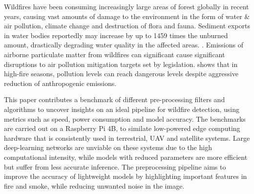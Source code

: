 \documentclass[lettersize,journal]{IEEEtran}
\begin{document}
Wildfires have been consuming increasingly large areas of forest globally in recent years, causing vast amounts of damage to the environment in the form of water & air pollution, climate change and destruction of flora and fauna.
Sediment exports in water bodies reportedly may increase by up to 1459 times the unburned amount, drastically degrading water quality in the affected areas. \cite{wildfirewater}.
Emissions of airborne particulate matter from wildfires can significant cause significant disruptions to air pollution mitigation targets set by legislation. \cite{wildfireair} shows that in high-fire seasons, pollution levels can reach dangerous levels despite aggressive reduction of anthropogenic emissions.









This paper contributes a benchmark of different pre-processing filters
and algorithms to uncover insights on an ideal pipeline for wildfire
detection, using metrics such as speed, power consumption and model
accuracy. The benchmarks are carried out on a Raspberry Pi 4B, to
similate low-powered edge computing hardware that is consistently used
in terrestrial, UAV and satellite systems. Large deep-learning networks
are unviable on these systems due to the high computational intensity,
while models with reduced parameters are more efficient but suffer from
less accurate inference. The preprocessing pipeline aims to improve the
accuracy of lightweight models by highlighting important features in
fire and smoke, while reducing unwanted noise in the image.
\end{document}
